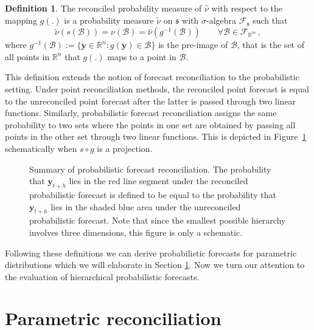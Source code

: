 \documentclass[12pt]{article}
\theoremstyle{definition}
\newtheorem{definition}{Definition}[section]
\begin{document}
\begin{definition} \label{def:reconprob}
	The reconciled probability measure of $\hat{\nu}$ with respect to the mapping $g(.)$ is a probability measure $\tilde{\nu}$ on $\mathfrak{s}$ with $\sigma$-algebra $\mathscr{F}_\mathfrak{s}$ such that
	\begin{equation}
	\tilde{\nu}(s(\mathcal{B})) = \nu(\mathcal{B})= \hat{\nu}(g^{-1}(\mathcal{B})) \qquad \forall \mathcal{B} \in \mathscr{F}_{\mathbb{R}^m}\,,
	\end{equation}
	where $g^{-1}(\mathcal{B}):=\{\breve{\bm{y}}\in \mathbb{R}^n:g(\breve{\bm{y}})\in \mathcal{B}\}$ is the pre-image of $\mathcal{B}$, that is the set of all points in $\mathbb{R}^n$ that $g(.)$ maps to a point in $\mathcal{B}$.
\end{definition}

This definition extends the notion of forecast reconciliation to the probabilistic setting. Under point reconciliation methods, the reconciled point forecast is equal to the unreconciled point forecast after the latter is passed through two linear functions. Similarly, probabilistic forecast reconciliation assigns the same probability to two sets where the points in one set are obtained by passing all points in the other set through two linear functions. This is depicted in Figure~\ref{fig:probfr_sch} schematically when $s\circ g$ is a projection.

\begin{figure}
	
	\caption{Summary of probabilistic forecast reconciliation. The probability that $\bm{y}_{t+h}$ lies in the red line segment under the reconciled probabilistic forecast is defined to be equal to the probability that $\bm{y}_{t+h}$ lies in the shaded blue area under the unreconciled probabilistic forecast. Note that since the smallest possible hierarchy involves three dimensions, this figure is only a schematic.}\label{fig:probfr_sch}
\end{figure}

Following these definitions we can derive probabilistic forecasts for parametric distributions which we will elaborate in Section \ref{sec:ParamRecon}. Now we turn our attention to the evaluation of hierarchical probabilistic forecasts.

\section{Parametric reconciliation} \label{sec:ParamRecon}
\end{document}
